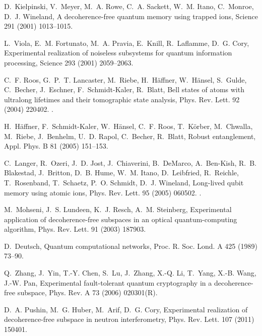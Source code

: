 \documentclass[3p,sort&compress]{elsarticle}
\begin{document}
\begin{thebibliography}{100}
D.~Kielpinski, V.~Meyer, M.~A. Rowe, C.~A. Sackett, W.~M. Itano, C.~Monroe,
  D.~J. Wineland, A decoherence-free quantum memory using trapped ions, Science
  291 (2001) 1013--1015.

L.~Viola, E.~M. Fortunato, M.~A. Pravia, E.~Knill, R.~Laflamme, D.~G. Cory,
  Experimental realization of noiseless subsystems for quantum information
  processing, Science 293 (2001) 2059--2063.

C.~F. Roos, G.~P.~T. Lancaster, M.~Riebe, H.~H\"affner, W.~H\"ansel, S.~Gulde,
  C.~Becher, J.~Eschner, F.~Schmidt-Kaler, R.~Blatt, Bell states of atoms with
  ultralong lifetimes and their tomographic state analysis, Phys. Rev. Lett. 92
  (2004) 220402.
\newblock \href {http://dx.doi.org/10.1103/PhysRevLett.92.220402}
  {}.

H.~H{\"a}ffner, F.~Schmidt-Kaler, W.~H{\"a}nsel, C.~F. Roos, T.~K{\"o}rber,
  M.~Chwalla, M.~Riebe, J.~Benhelm, U.~D. Rapol, C.~Becher, R.~Blatt, Robust
  entanglement, Appl. Phys. B 81 (2005) 151--153.

C.~Langer, R.~Ozeri, J.~D. Jost, J.~Chiaverini, B.~DeMarco, A.~Ben-Kish, R.~B.
  Blakestad, J.~Britton, D.~B. Hume, W.~M. Itano, D.~Leibfried, R.~Reichle,
  T.~Rosenband, T.~Schaetz, P.~O. Schmidt, D.~J. Wineland, Long-lived qubit
  memory using atomic ions, Phys. Rev. Lett. 95 (2005) 060502.
\newblock \href {http://dx.doi.org/10.1103/PhysRevLett.95.060502}
  {}.

M.~Mohseni, J.~S. Lundeen, K.~J. Resch, A.~M. Steinberg, Experimental
  application of decoherence-free subspaces in an optical quantum-computing
  algorithm, Phys. Rev. Lett. 91 (2003) 187903.

D.~Deutsch, Quantum computational networks, Proc. R. Soc. Lond. A 425 (1989)
  73--90.

Q.~Zhang, J.~Yin, T.-Y. Chen, S.~Lu, J.~Zhang, X.-Q. Li, T.~Yang, X.-B. Wang,
  J.-W. Pan, Experimental fault-tolerant quantum cryptography in a
  decoherence-free subspace, Phys. Rev. A 73 (2006) 020301(R).

D.~A. Pushin, M.~G. Huber, M.~Arif, D.~G. Cory, Experimental realization of
  decoherence-free subspace in neutron interferometry, Phys. Rev. Lett. 107
  (2011) 150401.


\end{thebibliography}
\end{document}
